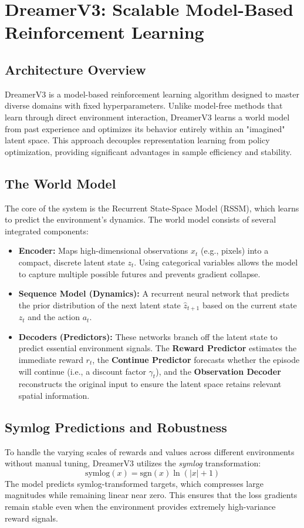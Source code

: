 \section{DreamerV3: Scalable Model-Based Reinforcement Learning}

\subsection{Architecture Overview}
DreamerV3 is a model-based reinforcement learning algorithm designed to master diverse domains with fixed hyperparameters. Unlike model-free methods that learn through direct environment interaction, DreamerV3 learns a world model from past experience and optimizes its behavior entirely within an "imagined" latent space. This approach decouples representation learning from policy optimization, providing significant advantages in sample efficiency and stability.

\subsection{The World Model}
The core of the system is the Recurrent State-Space Model (RSSM), which learns to predict the environment's dynamics. The world model consists of several integrated components:

\begin{itemize}
    \item \textbf{Encoder:} Maps high-dimensional observations $x_t$ (e.g., pixels) into a compact, discrete latent state $z_t$. Using categorical variables allows the model to capture multiple possible futures and prevents gradient collapse.
    \item \textbf{Sequence Model (Dynamics):} A recurrent neural network that predicts the prior distribution of the next latent state $\hat{z}_{t+1}$ based on the current state $z_t$ and the action $a_t$.
    \item \textbf{Decoders (Predictors):} These networks branch off the latent state to predict essential environment signals. The \textbf{Reward Predictor} estimates the immediate reward $r_t$, the \textbf{Continue Predictor} forecasts whether the episode will continue (i.e., a discount factor $\gamma_t$), and the \textbf{Observation Decoder} reconstructs the original input to ensure the latent space retains relevant spatial information.
\end{itemize}

\subsection{Symlog Predictions and Robustness}
To handle the varying scales of rewards and values across different environments without manual tuning, DreamerV3 utilizes the \textit{symlog} transformation:
\begin{equation}
    \text{symlog}(x) = \text{sgn}(x) \ln(|x| + 1)
\end{equation}
The model predicts symlog-transformed targets, which compresses large magnitudes while remaining linear near zero. This ensures that the loss gradients remain stable even when the environment provides extremely high-variance reward signals.

